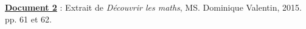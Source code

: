 {\pagebreak


{\bf\uline{Document 2}} : Extrait de {\it Découvrir les maths}, MS. Dominique Valentin, 2015. pp. 61 et 62. 

\begin{center}
    \\ [3cm]
\end{center}

\pagebreak


\begin{center}
\end{center}

}
